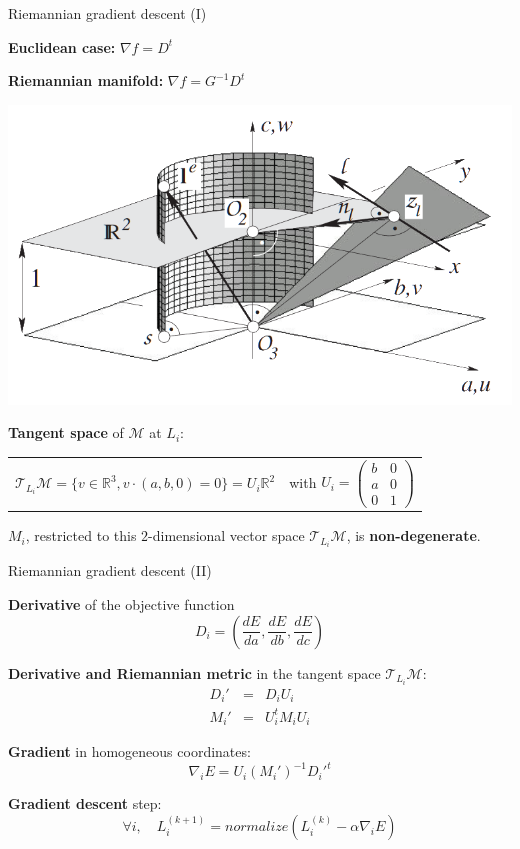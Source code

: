 \begin{frame}[c]{Riemannian gradient descent (I)}
	\scriptsize
	
	\begin{minipage}[t]{0.5\linewidth}
		\textbf{Euclidean case:} $\nabla f = D^{t}$
	\end{minipage}%
	\begin{minipage}[t]{0.5\linewidth}
		\centering
 		\textbf{Riemannian manifold:} $\nabla f = G^{-1} D^t$
	\end{minipage}%
	
	\begin{center}
	\includegraphics[width=0.5\linewidth]{euclidean_normalization_line}
	\end{center}

	\textbf{Tangent space} of $\mathcal{M}$ at $L_i$:
	\begin{tabular}{cc}
		$ \mathcal{T}_{L_i} \mathcal{M} = \{ v \in \mathbb{R}^3, v \cdot (a,b, 0) = 0 \} = U_i \mathbb{R}^2 $
		& with $U_i = \begin{pmatrix} b & 0 \\ a & 0 \\ 0 & 1 \end{pmatrix}$
	\end{tabular}

	$M_i$, restricted to this $2$-dimensional vector space $\mathcal{T}_{L_i} \mathcal{M}$, is \textbf{non-degenerate}.
\end{frame}

\begin{frame}[c]{Riemannian gradient descent (II)}
	\scriptsize

	\textbf{Derivative} of the objective function
	\[ D_i = \left( \frac{dE }{da},  \frac{dE }{db}, \frac{dE }{dc} \right) \]	
	
	\textbf{Derivative and Riemannian metric} in the tangent space $\mathcal{T}_{L_i} \mathcal{M}$:
	\begin{eqnarray*}
		D_i' &=& D_i U_i \\
		M_i' &=& U_i^t  M_i U_i
	\end{eqnarray*}
	
	\textbf{Gradient} in homogeneous coordinates:
	\[
	\nabla_i E = U_i (M_i')^{-1} {D_i'}^t
	\]
	
	\textbf{Gradient descent} step:
	\[
	\forall i,  \quad L_i^{(k+1)} = normalize\left(  L_i^{(k)} - \alpha \nabla_i E   \right) 
	\]
\end{frame}

